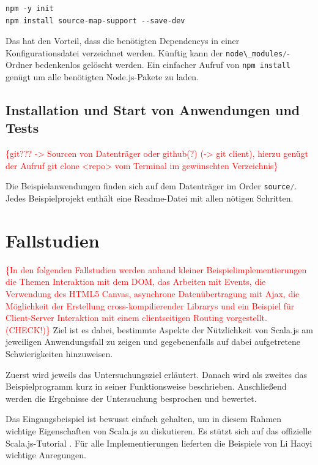 \documentclass[a4paper, 12pt, hidelinks, listof=totoc, listoftables=totoc, bibliography=totoc]{scrreprt}
\newcommand{\code}[1]{\lstinline[language=Scala, style=inline]|#1|}
\newcommand{\TODOi}[1]{\textcolor{red}{\{#1\}}}
\begin{document}
\begin{lstlisting}[style=snippet]
npm -y init
npm install source-map-support --save-dev
\end{lstlisting}

Das hat den Vorteil, dass die benötigten Dependencys in einer Konfigurationsdatei verzeichnet werden. Künftig kann der \code{node\_modules/}-Ordner bedenkenlos gelöscht werden. Ein einfacher Aufruf von \code{npm install} genügt um alle benötigten Node.js-Pakete zu laden.


\section{Installation und Start von Anwendungen und Tests}

\TODOi{git??? -> Sourcen von Datenträger oder github(?) (-> git client), hierzu genügt der Aufruf git clone <repo> vom Terminal im gewünschten Verzeichnis}

Die Beispielanwendungen finden sich auf dem Datenträger im Order \code{source/}. Jedes Beispielprojekt enthält eine Readme-Datei mit allen nötigen Schritten.


\chapter{Fallstudien}\label{chap:case-studies}

\TODOi{In den folgenden Fallstudien werden anhand kleiner Beispielimplementierungen die Themen Interaktion mit dem \ac{DOM}, das Arbeiten mit Events, die Verwendung des HTML5 Canvas, asynchrone Datenübertragung mit Ajax, die Möglichkeit der Erstellung cross-kompilierender Librarys und ein Beispiel für Client-Server Interaktion mit einem clientseitigen Routing vorgestellt. (CHECK!)} Ziel ist es dabei, bestimmte Aspekte der Nützlichkeit von Scala.js am jeweiligen Anwendungsfall zu zeigen und gegebenenfalls auf dabei aufgetretene Schwierigkeiten hinzuweisen.

Zuerst wird jeweils das Untersuchungsziel erläutert. Danach wird als zweites das Beispielprogramm kurz in seiner Funktionsweise beschrieben. Anschließend werden die Ergebnisse der Untersuchung besprochen und bewertet.

Das Eingangsbeispiel ist bewusst einfach gehalten, um in diesem Rahmen wichtige Eigenschaften von Scala.js zu diskutieren. Es stützt sich auf das offizielle Scala.js-Tutorial \cite{scalajs.SJT}. Für alle Implementierungen lieferten die Beispiele von Li Haoyi \cite{haoyi.HOS} wichtige Anregungen.
\end{document}
